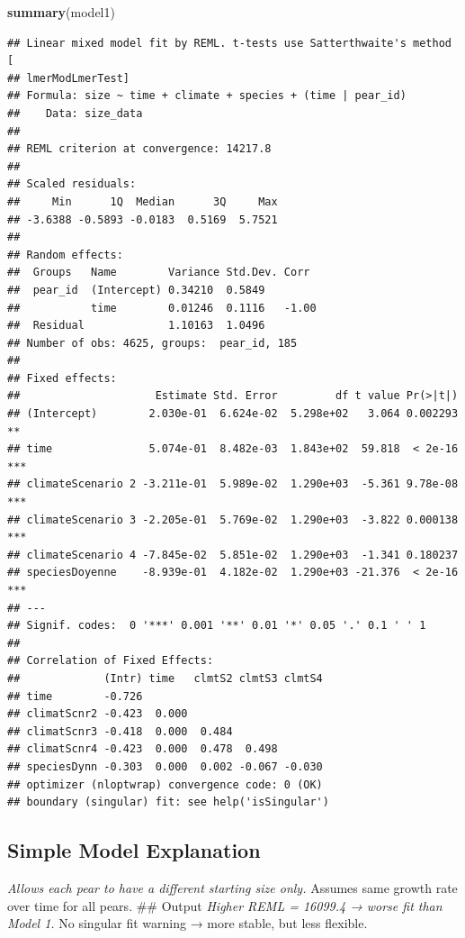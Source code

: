 \documentclass[
]{article}
\newenvironment{Shaded}{\begin{snugshade}}{\end{snugshade}}
\newcommand{\FunctionTok}[1]{\textcolor[rgb]{0.13,0.29,0.53}{\textbf{#1}}}
\newcommand{\NormalTok}[1]{#1}
\begin{document}
\begin{Shaded}
\begin{Highlighting}[]
\FunctionTok{summary}\NormalTok{(model1)}
\end{Highlighting}
\end{Shaded}

\begin{verbatim}
## Linear mixed model fit by REML. t-tests use Satterthwaite's method [
## lmerModLmerTest]
## Formula: size ~ time + climate + species + (time | pear_id)
##    Data: size_data
## 
## REML criterion at convergence: 14217.8
## 
## Scaled residuals: 
##     Min      1Q  Median      3Q     Max 
## -3.6388 -0.5893 -0.0183  0.5169  5.7521 
## 
## Random effects:
##  Groups   Name        Variance Std.Dev. Corr 
##  pear_id  (Intercept) 0.34210  0.5849        
##           time        0.01246  0.1116   -1.00
##  Residual             1.10163  1.0496        
## Number of obs: 4625, groups:  pear_id, 185
## 
## Fixed effects:
##                     Estimate Std. Error         df t value Pr(>|t|)    
## (Intercept)        2.030e-01  6.624e-02  5.298e+02   3.064 0.002293 ** 
## time               5.074e-01  8.482e-03  1.843e+02  59.818  < 2e-16 ***
## climateScenario 2 -3.211e-01  5.989e-02  1.290e+03  -5.361 9.78e-08 ***
## climateScenario 3 -2.205e-01  5.769e-02  1.290e+03  -3.822 0.000138 ***
## climateScenario 4 -7.845e-02  5.851e-02  1.290e+03  -1.341 0.180237    
## speciesDoyenne    -8.939e-01  4.182e-02  1.290e+03 -21.376  < 2e-16 ***
## ---
## Signif. codes:  0 '***' 0.001 '**' 0.01 '*' 0.05 '.' 0.1 ' ' 1
## 
## Correlation of Fixed Effects:
##             (Intr) time   clmtS2 clmtS3 clmtS4
## time        -0.726                            
## climatScnr2 -0.423  0.000                     
## climatScnr3 -0.418  0.000  0.484              
## climatScnr4 -0.423  0.000  0.478  0.498       
## speciesDynn -0.303  0.000  0.002 -0.067 -0.030
## optimizer (nloptwrap) convergence code: 0 (OK)
## boundary (singular) fit: see help('isSingular')
\end{verbatim}

\subsection{Simple Model Explanation}\label{simple-model-explanation}

\emph{Allows each pear to have a different starting size only. }Assumes
same growth rate over time for all pears. \#\# Output \emph{Higher REML
= 16099.4 → worse fit than Model 1. }No singular fit warning → more
stable, but less flexible.
\end{document}
